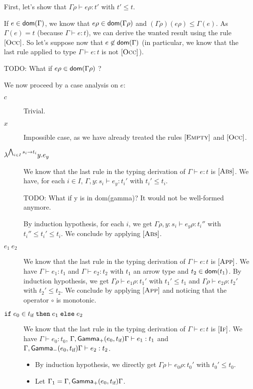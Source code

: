 \documentclass[a4paper]{article}
\theoremstyle{definition}
\begin{document}
        First, let's show that $\Gamma \rho \vdash e \rho:t'$ with $t'\leq t$.
    
        If $e\in\textsf{dom}(\Gamma)$, we know that $e\rho\in\textsf{dom}(\Gamma\rho)$ and $(\Gamma\rho)(e\rho) \leq \Gamma(e)$.
        As $\Gamma(e) = t$ (because $\Gamma \vdash e:t$), we can derive the wanted result using the rule $[\textsc{Occ}]$.
        So let's suppose now that $e\not\in\textsf{dom}(\Gamma)$ (in particular, we know that the last rule applied to type $\Gamma \vdash e:t$ is not $[\textsc{Occ}]$).
        
        TODO: What if $e\rho\in\textsf{dom}(\Gamma\rho)$ ? 

        We now proceed by a case analysis on $e$:
        
        \begin{description}
          \item[$c$] Trivial.
          \item[$x$] Impossible case, as we have already treated the rules $[\textsc{Empty}]$ and $[\textsc{Occ}]$.
          \item[$\lambda^{\bigwedge_{i\in I} s_i\to t_i}y.e_y$]
          We know that the last rule in the typing derivation of $\Gamma \vdash e:t$ is $[\textsc{Abs}]$.
          We have, for each $i \in I$, $\Gamma,y:s_i \vdash e_y:t_i'$ with $t_i'\leq t_i$.
          
          TODO: What if y is in dom(gamma)? It would not be well-formed anymore.

          By induction hypothesis, for each $i$, we get  $\Gamma\rho,y:s_i \vdash e_y\rho:t_i''$ with $t_i''\leq t_i'\leq t_i$. We conclude by applying $[\textsc{Abs}]$.
          \item[$e_1\ e_2$] We know that the last rule in the typing derivation of $\Gamma \vdash e:t$ is $[\textsc{App}]$.
          We have $\Gamma\vdash e_1:t_1$ and $\Gamma\vdash e_2:t_2$ with $t_1$ an arrow type and $t_2 \in \textsf{dom}(t_1)$.
          By induction hypothesis, we get $\Gamma\rho\vdash e_1\rho:t_1'$ with $t_1' \leq t_1$ and $\Gamma\rho\vdash e_2\rho:t_2'$ with $t_2' \leq t_2$.
          We conclude by applying $[\textsc{App}]$ and noticing that the operator $\circ$ is monotonic.
          \item[$\texttt{if}\;e_0\in t_{\text{if}}\;\texttt{then}\;e_1\;\texttt{else}\;e_2$] We know that the last rule in the typing derivation of $\Gamma \vdash e:t$ is $[\textsc{If}]$.
          We have $\Gamma\vdash e_0:t_0$, $\Gamma,\textsf{Gamma}_{+}(e_0,t_{\text{if}}) \Gamma\vdash e_1 : t_1$ and $\Gamma,\textsf{Gamma}_{-}(e_0,t_{\text{if}}) \Gamma\vdash e_2 : t_2$.
          \begin{itemize}
            \item By induction hypothesis, we directly get $\Gamma\rho\vdash e_0\rho:t_0'$ with $t_0'\leq t_0$.
            \item Let $\Gamma_1 = \Gamma,\textsf{Gamma}_{+}(e_0,t_{\text{if}}) \Gamma$.
            

\end{itemize}
\end{description}
\end{document}
